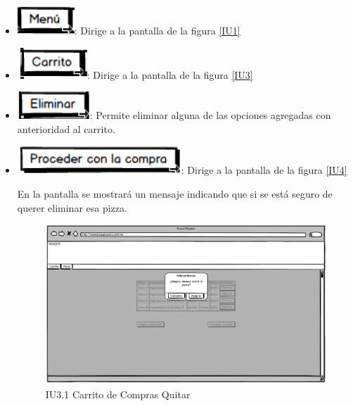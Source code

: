 \begin{itemize}
	
	\item \includegraphics[scale=0.500]{imagenes/iconografia/Menu.png}: Dirige a la pantalla de la figura \ref{IU1}
	\item \includegraphics[scale=0.500]{imagenes/iconografia/Carrito.png}: Dirige a la pantalla de la figura \ref{IU3}
	\item \includegraphics[scale=0.500]{imagenes/iconografia/Eliminar.png}: Permite eliminar alguna de las opciones agregadas con anterioridad al carrito.
	\item \includegraphics[scale=0.500]{imagenes/iconografia/Proceder.png}: Dirige a la pantalla de la figura \ref{IU4}
	
	En la pantalla se mostrará un mensaje indicando que si se está seguro de querer eliminar esa pizza.
	
	
	\begin{figure}[h]
		
		\begin{center}				
			
			\includegraphics[scale=0.50]{imagenes/IUs/RegistroSolicitantes/iu1-IniciarSesion/IU3-1CarritoDeComprasQuitar.png}
			\caption{IU3.1 Carrito de Compras Quitar}
			\label{IU3.1}
			

\end{center}
\end{figure}
\end{itemize}
